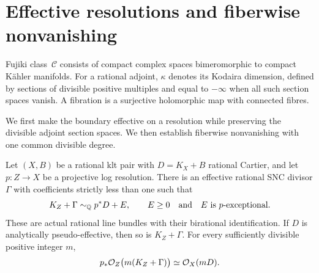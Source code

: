 \section{Effective resolutions and fiberwise nonvanishing}\label{sec:resolution-fibers}

Fujiki class~$\mathcal C$ consists of compact complex spaces
bimeromorphic to compact Kähler manifolds. For a rational adjoint,
$\kappa$ denotes its Kodaira dimension, defined by sections of divisible
positive multiples and equal to $-\infty$ when all such section spaces
vanish. A fibration is a surjective holomorphic map with connected
fibres.

We first make the boundary effective on a resolution while preserving
the divisible adjoint section spaces. We then establish fiberwise
nonvanishing with one common divisible degree.

\begin{lemma}\label{lem:supply-log-resolution}
Let $(X,B)$ be a rational klt pair with $D=K_X+B$ rational Cartier, and let
$p:Z\to X$ be a projective log resolution.  There is an effective rational
SNC divisor $\Gamma$ with coefficients strictly less than one such that
\begin{equation}\label{eq:supply-log-resolution}
 K_Z+\Gamma\sim_{\mathbb Q} p^*D+E,
 \qquad E\geq0\quad\text{and}\quad E\text{ is }p\text{-exceptional}.
\end{equation}
These are actual rational line bundles with their birational
identification.  If $D$ is analytically pseudo-effective, then so is
$K_Z+\Gamma$.  For every sufficiently divisible positive integer $m$,
\begin{equation}\label{eq:supply-section-descent}
 p_*\mathcal O_Z\bigl(m(K_Z+\Gamma)\bigr)
 \simeq \mathcal O_X(mD).
\end{equation}
\end{lemma}


